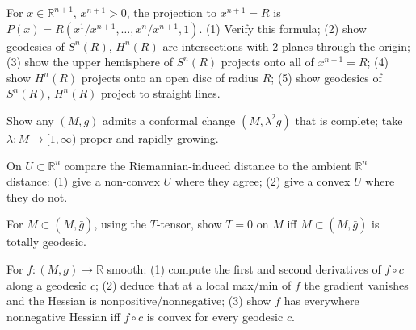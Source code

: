 \begin{remark}
  \label{rem:pet-ch5-ex-17}
  For $x\in\mathbb R^{n+1}$, $x^{n+1}>0$, the projection to $x^{n+1}=R$ is
  $P(x)=R(x^1/x^{n+1},\dots,x^n/x^{n+1},1)$. (1) Verify this formula; (2) show
  geodesics of $S^n(R)$, $H^n(R)$ are intersections with $2$-planes through the
  origin; (3) show the upper hemisphere of $S^n(R)$ projects onto all of
  $x^{n+1}=R$; (4) show $H^n(R)$ projects onto an open disc of radius $R$; (5) show
  geodesics of $S^n(R)$, $H^n(R)$ project to straight lines.
\end{remark}

\begin{remark}
  \label{rem:pet-ch5-ex-18}
  Show any $(M,g)$ admits a conformal change $(M,\lambda^2g)$ that is complete;
  take $\lambda:M\to[1,\infty)$ proper and rapidly growing.
\end{remark}

\begin{remark}
  \label{rem:pet-ch5-ex-19}
  On $U\subset\mathbb R^n$ compare the Riemannian-induced distance to the ambient
  $\mathbb R^n$ distance: (1) give a non-convex $U$ where they agree; (2) give a
  convex $U$ where they do not.
\end{remark}

\begin{remark}
  \label{rem:pet-ch5-ex-20}
  For $M\subset(\bar M,\bar g)$, using the $T$-tensor, show $T=0$ on $M$ iff
  $M\subset(\bar M,\bar g)$ is totally geodesic.
\end{remark}

\begin{remark}
  \label{rem:pet-ch5-ex-21}
  For $f:(M,g)\to\mathbb R$ smooth: (1) compute the first and second derivatives of
  $f\circ c$ along a geodesic $c$; (2) deduce that at a local max/min of $f$ the
  gradient vanishes and the Hessian is nonpositive/nonnegative; (3) show $f$ has
  everywhere nonnegative Hessian iff $f\circ c$ is convex for every geodesic $c$.
\end{remark}

